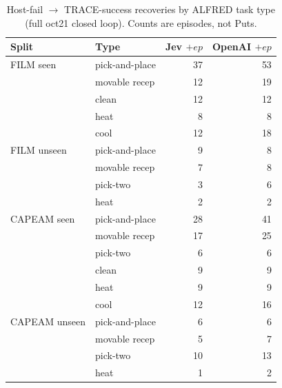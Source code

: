 \begin{table}[t]
\centering
\caption{Host-fail $\to$ TRACE-success recoveries by ALFRED task type (full oct21 closed loop).
Counts are episodes, not Puts.}
\label{tab:gain}
\scriptsize
\begin{tabular}{llrr}
\toprule
Split & Type & Jev $+ep$ & OpenAI $+ep$ \\
\midrule
FILM seen & pick-and-place & 37 & 53 \\
 & movable recep & 12 & 19 \\
 & clean & 12 & 12 \\
 & heat & 8 & 8 \\
 & cool & 12 & 18 \\
\midrule
FILM unseen & pick-and-place & 9 & 8 \\
 & movable recep & 7 & 8 \\
 & pick-two & 3 & 6 \\
 & heat & 2 & 2 \\
\midrule
CAPEAM seen & pick-and-place & 28 & 41 \\
 & movable recep & 17 & 25 \\
 & pick-two & 6 & 6 \\
 & clean & 9 & 9 \\
 & heat & 9 & 9 \\
 & cool & 12 & 16 \\
\midrule
CAPEAM unseen & pick-and-place & 6 & 6 \\
 & movable recep & 5 & 7 \\
 & pick-two & 10 & 13 \\
 & heat & 1 & 2 \\
\bottomrule
\end{tabular}
\end{table}
